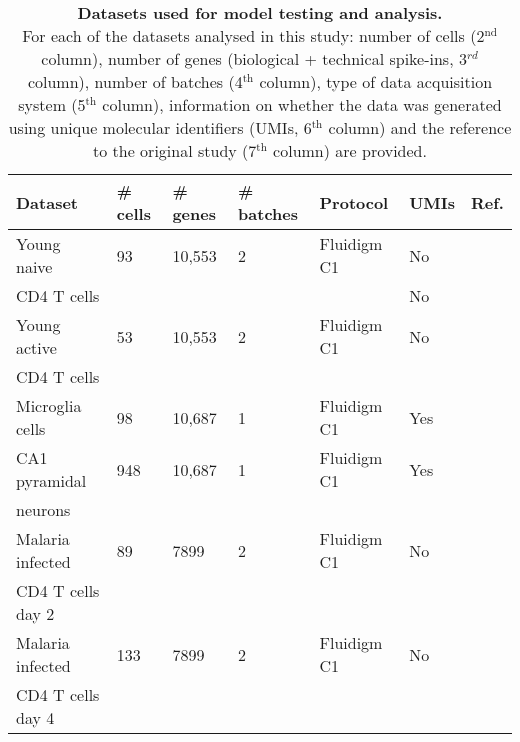 \begin{table}[ht	]
\centering
\caption[Datasets used for model testing and analysis]{\textbf{Datasets used for model testing and analysis.} \\
For each of the datasets analysed in this study: number of cells (2$^\text{nd}$ column), number of genes (biological + technical spike-ins, 3$^{rd}$ column), number of batches (4$^\text{th}$ column), type of data acquisition system (5$^\text{th}$ column), information on whether the data was generated using unique molecular identifiers (UMIs, 6$^\text{th}$ column) and the reference to the original study (7$^\text{th}$ column) are provided.}
\label{tab2:datasets}
\begin{tabular}{lllllll}
\toprule
\textbf{Dataset} & \textbf{\# cells} & \textbf{\# genes} & \textbf{\# batches} & \textbf{Protocol} & \textbf{UMIs} & \textbf{Ref.}                       \\
\midrule
Young naive  & 93       & 10,553    & 2          & Fluidigm C1       & No   & \citep{Martinez-jimenez2017} \\
CD4\plus{} T cells   &        &   &          &       & No   &  \\
\midrule

Young active    & 53       & 10,553    & 2          & Fluidigm C1       & No   & \citep{Martinez-jimenez2017} \\
CD4\plus{} T cells    &        &     &           &        &    &  \\
\midrule

Microglia cells                         & 98       & 10,687    & 1          & Fluidigm C1       & Yes  & \citep{Zeisel2015}           \\
\midrule

CA1 pyramidal                    & 948      & 10,687    & 1          & Fluidigm C1       & Yes  & \citep{Zeisel2015}           \\
neurons       &       &     &           &       &   &           \\
\midrule

Malaria infected     & 89       & 7899     & 2          & Fluidigm C1       & No   & \citep{Lonnberg2017}         \\
CD4\plus{} T cells day 2     &        &      &          &  &    &  \\
\midrule

Malaria infected  & 133      & 7899     & 2          & Fluidigm C1       & No   & \citep{Lonnberg2017}         \\
CD4\plus{} T cells day 4     &       &      &    &  &    &\\
\midrule


\end{tabular}
\end{table}
